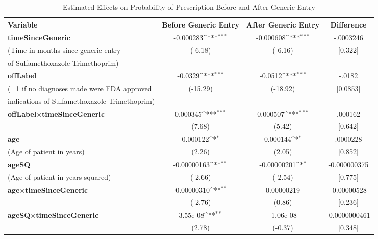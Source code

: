 \begin{table}[htbp]\centering
\def\sym#1{\ifmmode^{#1}\else\(^{#1}\)\fi}
\caption{Estimated Effects on Probability of Prescription Before and After Generic Entry\label{tab1}}
\begin{tabular}{l*{3}{c}}
\hline\hline
Variable            &\multicolumn{1}{c}{Before Generic Entry}&\multicolumn{1}{c}{After Generic Entry}&\multicolumn{1}{c}{Difference}\\
\hline
\textbf{timeSinceGeneric}&   -0.000283\sym{***}&   -0.000608\sym{***}&   -.0003246\\
(Time in months since generic entry            &     (-6.18)         &     (-6.16)         &     [0.322]         \\
of Sulfamethoxazole-Trimethoprim)\\
[1em]
\textbf{offLabel}    &     -0.0329\sym{***}&     -0.0512\sym{***}&   -.0182\\
(=1 if no diagnoses made were FDA approved            &    (-15.29)         &    (-18.92)         &    [0.0853]         \\
indications of Sulfamethoxazole-Trimethoprim)\\
[1em]
\textbf{offLabel}$\times$\textbf{timeSinceGeneric} &    0.000345\sym{***}&    0.000507\sym{***}&   .000162\\
            &      (7.68)         &      (5.42)         &    [0.642]         \\
[1em]
\textbf{age}         &    0.000122\sym{*}  &    0.000144\sym{*}  &   .0000228\\
(Age of patient in years)            &      (2.26)         &      (2.05)         &    [0.852]         \\
[1em]
\textbf{ageSQ}       & -0.00000163\sym{**} & -0.00000201\sym{*}  &   -0.000000375\\
(Age of patient in years squared)            &     (-2.66)         &     (-2.54)         &    [0.775]         \\
[1em]
\textbf{age}$\times$\textbf{timeSinceGeneric}      & -0.00000310\sym{**} &  0.00000219         &   -0.00000528\\
            &     (-2.76)         &      (0.86)         &    [0.236]         \\
[1em]
\textbf{ageSQ}$\times$\textbf{timeSinceGeneric}    &    3.55e-08\sym{**} &   -1.06e-08         &   -0.0000000461\\
            &      (2.78)         &     (-0.37)         &    [0.348]         \\
[1em]

\end{tabular}
\end{table}

